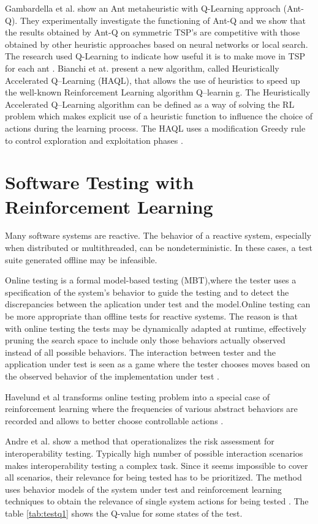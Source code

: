 Gambardella et al. show an Ant metaheuristic with Q-Learning approach (Ant-Q). They experimentally investigate the functioning of Ant-Q and we show that the results obtained by Ant-Q on symmetric TSP's are competitive with those obtained by other heuristic approaches based on neural networks or
local search. The research used Q-Learning to indicate how useful it is to make move in TSP for each ant \cite{Gambardella1995}.  Bianchi et at.  present a new algorithm, called Heuristically Accelerated Q–Learning (HAQL), that allows the use of heuristics to speed up the well-known Reinforcement Learning algorithm Q–learnin    g. The Heuristically Accelerated Q–Learning algorithm can be defined as a way of solving the RL problem which makes explicit use of a heuristic function to influence the choice of actions during the learning process. The HAQL uses a modification Greedy rule to control exploration and exploitation phases \cite{Matsuura2015}. 

\section{Software Testing with Reinforcement Learning}

Many software systems are reactive. The behavior of a reactive system, especially when distributed or multithreaded, can be nondeterministic. In these cases, a test suite generated offline may be infeasible.

Online testing is a formal model-based testing (MBT),where the tester uses a specification of the system's behavior to guide the testing and to detect the discrepancies between the aplication under test and the model.Online testing can be more appropriate than offline tests for reactive systems. The reason is that with online testing the tests may be dynamically adapted at runtime, effectively pruning the search space to include only those behaviors actually observed instead of all possible behaviors. The interaction between tester and the application under test is seen as a game  where the tester chooses moves based on the observed behavior of the implementation under test \cite{Havelund2006}.

Havelund et al transforms online testing problem into a special case of reinforcement learning where the frequencies of various abstract behaviors are recorded and allows to better choose controllable actions \cite{Havelund2006}.

Andre et al. show a method that operationalizes the risk assessment for interoperability testing. Typically high number of possible interaction scenarios makes interoperability testing a complex task. Since it seems impossible to cover all scenarios, their relevance for being tested has to be prioritized. The method uses behavior models of the system under test and reinforcement learning techniques to obtain the relevance of single system actions for being tested \cite{Piel2010}. The table \ref{tab:testq1} shows the Q-value for some states of the test. 


